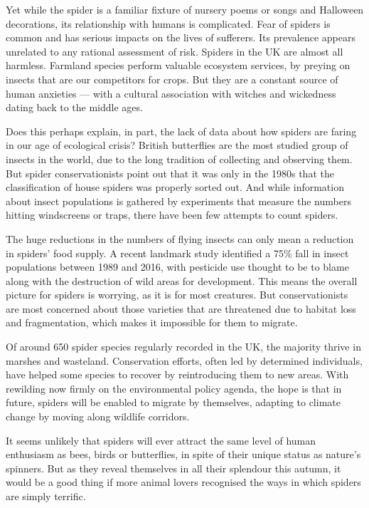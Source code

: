 \documentclass[UTF8,11pt]{ctexart}
\begin{document}
Yet while the spider is a familiar fixture of nursery poems or songs and Halloween decorations, its relationship with humans is complicated. Fear of spiders is common and has serious impacts on the lives of sufferers. Its prevalence appears unrelated to any rational assessment of risk. Spiders in the UK are almost all harmless. Farmland species perform valuable ecosystem services, by preying on insects that are our competitors for crops. But they are a constant source of human anxieties — with a cultural association with witches and wickedness dating back to the middle ages.


Does this perhaps explain, in part, the lack of data about how spiders are faring in our age of ecological crisis? British butterflies are the most studied group of insects in the world, due to the long tradition of collecting and observing them. But spider conservationists point out that it was only in the 1980s that the classification of house spiders was properly sorted out. And while information about insect populations is gathered by experiments that measure the numbers hitting windscreens or traps, there have been few attempts to count spiders.


The huge reductions in the numbers of flying insects can only mean a reduction in spiders’ food supply. A recent landmark study identified a 75\% fall in insect populations between 1989 and 2016, with pesticide use thought to be to blame along with the destruction of wild areas for development. This means the overall picture for spiders is worrying, as it is for most creatures. But conservationists are most concerned about those varieties that are threatened due to habitat loss and fragmentation, which makes it impossible for them to migrate.


Of around 650 spider species regularly recorded in the UK, the majority thrive in marshes and wasteland. Conservation efforts, often led by determined individuals, have helped some species to recover by reintroducing them to new areas. With rewilding now firmly on the environmental policy agenda, the hope is that in future, spiders will be enabled to migrate by themselves, adapting to climate change by moving along wildlife corridors.


It seems unlikely that spiders will ever attract the same level of human enthusiasm as bees, birds or butterflies, in spite of their unique status as nature’s spinners. But as they reveal themselves in all their splendour this autumn, it would be a good thing if more animal lovers recognised the ways in which spiders are simply terrific.
\end{document}
